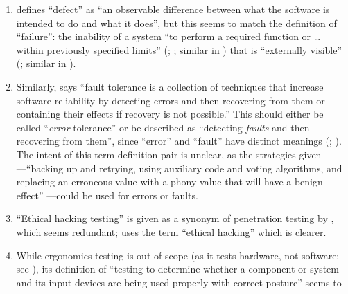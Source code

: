 \begin{enumerate}
    \item %
           \citet[p.~1\=/1]{SWEBOK2024} defines ``defect'' as ``an
          observable difference between what the software is intended to do and
          what it does'', but this seems to match the definition of
          ``failure'': the inability of a system ``to perform a required
          function or \dots{} within previously specified limits''
          (\citealp[p.~7]{IEEE2019a}; \citeyear[p.~139]{IEEE2010}%
          ; similar in \citealp[p.~400]{vanVliet2000})
          that is ``externally visible'' (\citealp[p.~7]{IEEE2019a}; similar in
          \citealp[p.~400]{vanVliet2000}).
    \item %
          Similarly, \citet[p.~4\=/11]{SWEBOK2024} says ``fault tolerance is
          a collection of techniques that increase software reliability by
          detecting errors and then recovering from them or containing their
          effects if recovery is not possible.'' This should either be called
          ``\emph{error} tolerance'' or be described as ``detecting
          \emph{faults} and then recovering from them'', since ``error'' and
          ``fault'' have distinct meanings (\citealp[p.~5\=/3]{SWEBOK2024};
          \citealp[pp.~399\==400]{vanVliet2000}). The intent of this
          term-definition pair is unclear, as the strategies given---``backing
          up and retrying, using auxiliary code and voting algorithms, and
          replacing an erroneous value with a phony value that will have a
          benign effect'' \citep[p.~4\=/11]{SWEBOK2024}---could be used for
          errors or faults.
    \item %
          ``Ethical hacking testing'' is given as a synonym of penetration
          testing by \citet[p.~13\=/4]{SWEBOK2024}, which seems redundant;
          \citet[p.~28]{Gerrard2000b} uses the term ``ethical hacking'' which
          is clearer.
    \item %
          While ergonomics testing is out of scope (as it tests hardware, not
          software; see ), its definition of ``testing to
          determine whether a component or system and its input devices are
          being used properly with correct posture'' \citepISTQB{} seems to

\end{enumerate}
